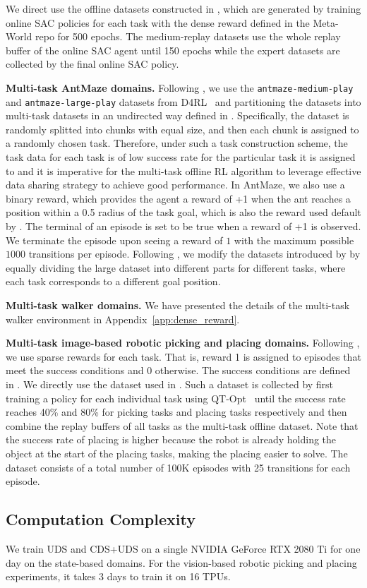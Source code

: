 We direct use the offline datasets constructed in \cite{yu2021conservative}, which are generated by training online SAC policies for each task with the dense reward defined in the Meta-World repo for 500 epochs. The medium-replay datasets use the whole replay buffer of the online SAC agent until 150 epochs while the expert datasets are collected by the final online SAC policy.

\textbf{Multi-task AntMaze domains.} Following \cite{yu2021conservative}, we use the \texttt{antmaze-medium-play} and \texttt{antmaze-large-play} datasets from D4RL~\citep{fu2020d4rl} and partitioning the datasets into multi-task datasets in an undirected way defined in \cite{yu2021conservative}. Specifically, the dataset is randomly splitted into chunks with equal size, and then each chunk is assigned to a randomly chosen task. Therefore, under such a task construction scheme, the task data for each task is of low success rate for the particular task it is assigned to and it is imperative for the multi-task offline RL algorithm to leverage effective data sharing strategy to achieve good performance. In AntMaze, we also use a binary reward, which provides the agent a reward of +1 when the ant reaches a position within a 0.5 radius of the task goal, which is also the reward used default by \citet{fu2020d4rl}. The terminal of an episode is set to be true when a reward of +1 is observed. We terminate the episode upon seeing a reward of $1$ with the maximum possible $1000$ transitions per episode. Following \cite{yu2021conservative}, we modify the datasets introduced by \citet{fu2020d4rl} by equally dividing the large dataset into different parts for different tasks, where each task corresponds to a different goal position.

\textbf{Multi-task walker domains.} We have presented the details of the multi-task walker environment in Appendix~\ref{app:dense_reward}.

\textbf{Multi-task image-based robotic picking and placing domains.} Following \cite{kalashnikov2021mt,yu2021conservative}, we use sparse rewards for each task. That is, reward 1 is assigned to episodes that meet the success conditions and 0 otherwise. The success conditions are defined in \citep{kalashnikov2021mt}. 
We directly use the dataset used in \cite{yu2021conservative}. Such a dataset is collected by first training a policy for each individual task using QT-Opt~\citep{kalashnikov2018scalable} until the success rate reaches 40\% and 80\% for picking tasks and placing tasks respectively and then combine the replay buffers of all tasks as the multi-task offline dataset. Note that the success rate of placing is higher because the robot is already holding the object at the start of the placing tasks, making the placing easier to solve. The dataset consists of a total number of 100K episodes with 25 transitions for each episode. 

\subsection{Computation Complexity}
\label{app:compute_details}

We train UDS and CDS+UDS on a single NVIDIA GeForce RTX 2080 Ti for one day on the state-based domains. For the vision-based robotic picking and placing experiments, it takes 3 days to train it on 16 TPUs.







